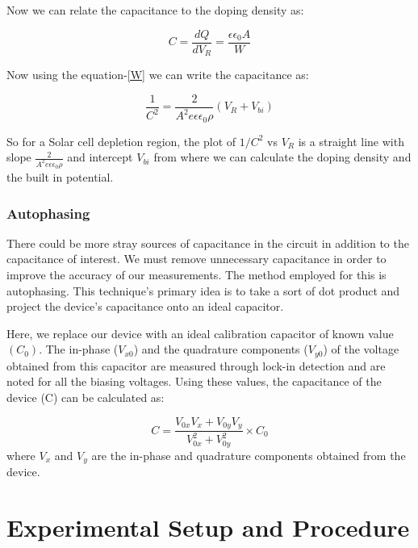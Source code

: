 \documentclass{article}
\begin{document}
\begin{multicols}{2}
Now we can relate the capacitance to the doping density as:

\begin{equation}
    C = \frac{dQ}{dV_R} = \frac{\epsilon \epsilon_0 A}{W}
\end{equation}

Now using the equation-\ref{W} we can write the capacitance as:


\begin{equation}
    \frac{1}{C^2} = \frac{2}{A^2e\epsilon \epsilon_0 \rho} (V_R + V_{bi})
    \label{CV_eqn}
\end{equation}

So for a Solar cell depletion region, the plot of $1/C^2$ vs $V_R$ is a straight  line with slope $\frac{2}{A^2e\epsilon \epsilon_0 \rho}$ and  intercept $V_{bi}$ from where we can calculate the doping density and the built  in potential.\cite{reynolds2014capacitance}


\subsubsection{Autophasing}

There could be more stray sources of capacitance in the 
circuit in addition to the capacitance of interest. We must 
remove unnecessary capacitance in order to improve the 
accuracy of our measurements. The method employed for 
this is autophasing. This technique's primary idea is to 
take a sort of dot product and project the device's 
capacitance onto an ideal capacitor. 


Here, we replace our device with an ideal 
calibration capacitor of known value $(C_0)$.
The in-phase ($V_{x0}$) and the quadrature components ($V_{y0}$) of the 
voltage obtained from this capacitor are
measured through lock-in detection and are 
noted for all the biasing voltages. Using
these values, the capacitance of the 
device (C) can be calculated as: 


\begin{equation}
    C = \frac{V_{0x}V_x + V_{0y}V_y }{V_{0x}^2 + V_{0y}^2} \times C_{0}
\end{equation}
where $V_x$ and $V_y$ are the in-phase and quadrature components obtained from the device.


\section{Experimental Setup and Procedure }



\end{multicols}
\end{document}
